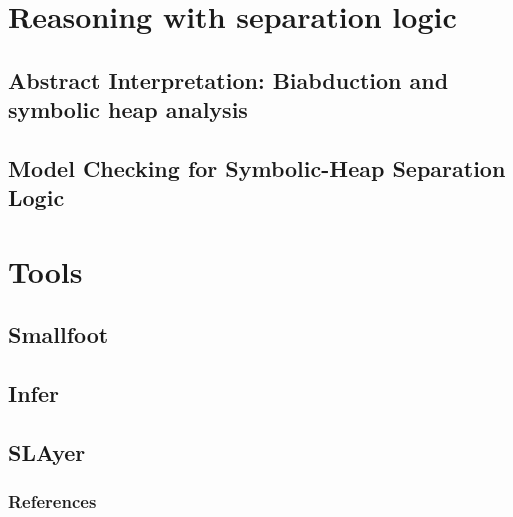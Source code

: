 \documentclass[professionalfont]{beamer}
\begin{document}
    \section{Reasoning with separation logic}
    \subsection{Abstract Interpretation: Biabduction and symbolic heap  analysis}
    \subsection{Model Checking for Symbolic-Heap Separation Logic }
    \section{Tools}
    \subsection{Smallfoot}
    \subsection{Infer}
    \subsection{SLAyer}
    \begin{frame}[allowframebreaks]
     
        \nocite{*}
        \frametitle{References}
        
        
    \end{frame}
\end{document}
